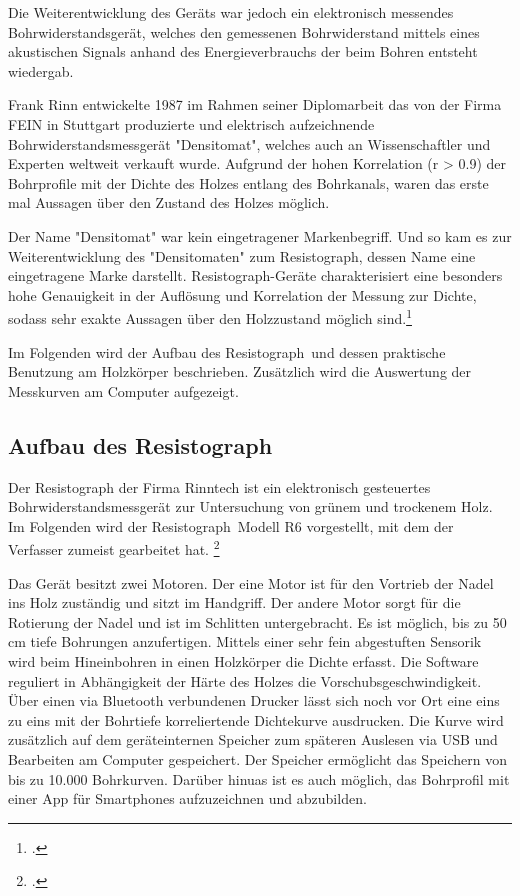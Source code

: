 \documentclass[a4paper, halfparskip]{article}
\def\SymbReg{\textsuperscript{\textregistered}}
\begin{document}
Die Weiterentwicklung des Geräts war jedoch ein elektronisch messendes
Bohrwiderstandsgerät, welches den gemessenen Bohrwiderstand mittels eines
akustischen Signals anhand des Energieverbrauchs der beim Bohren entsteht
wiedergab.

Frank Rinn entwickelte 1987 im Rahmen seiner Diplomarbeit das von der Firma
FEIN in Stuttgart produzierte und elektrisch aufzeichnende
Bohrwiderstandsmessgerät "Densitomat", welches auch an Wissenschaftler und
Experten weltweit verkauft wurde. Aufgrund der hohen Korrelation (r
\textgreater{} 0.9) der Bohrprofile mit der Dichte des Holzes entlang des
Bohrkanals, waren das erste mal Aussagen über den Zustand des Holzes möglich.

Der Name "Densitomat" war kein eingetragener Markenbegriff. Und so kam es zur
Weiterentwicklung des "Densitomaten" zum Resistograph\SymbReg, dessen Name
eine eingetragene Marke darstellt. Resistograph\SymbReg-Geräte charakterisiert
eine besonders hohe Genauigkeit in der Auflösung und Korrelation der Messung
zur Dichte, sodass sehr exakte Aussagen über den Holzzustand möglich
sind.\footcite{rinn:resi_drill_transition}

Im Folgenden wird der Aufbau des Resistograph\SymbReg\ und dessen praktische
Benutzung am Holzkörper beschrieben. Zusätzlich wird die Auswertung der
Messkurven am Computer aufgezeigt. 

\subsection{Aufbau des Resistograph\SymbReg}
Der Resistograph der Firma Rinntech ist ein elektronisch gesteuertes
Bohrwiderstandsmessgerät zur Untersuchung von grünem und trockenem Holz. Im
Folgenden wird der Resistograph\SymbReg\ Modell R6 vorgestellt, mit dem der
Verfasser zumeist gearbeitet hat.
\footcite{rinn:risserkennung}

Das Gerät besitzt zwei Motoren. Der eine Motor ist für den Vortrieb der Nadel
ins Holz zuständig und sitzt im Handgriff. Der andere Motor sorgt für die
Rotierung der Nadel und ist im Schlitten untergebracht. Es ist möglich, bis zu
50 cm tiefe Bohrungen anzufertigen. Mittels einer sehr fein abgestuften
Sensorik wird beim Hineinbohren in einen Holzkörper die Dichte erfasst. Die
Software reguliert in Abhängigkeit der Härte des Holzes die
Vorschubsgeschwindigkeit. Über einen via Bluetooth verbundenen Drucker lässt
sich noch vor Ort eine eins zu eins mit der Bohrtiefe korreliertende
Dichtekurve ausdrucken. Die Kurve wird zusätzlich auf dem geräteinternen
Speicher zum späteren Auslesen via USB und Bearbeiten am Computer gespeichert.
Der Speicher ermöglicht das Speichern von bis zu 10.000 Bohrkurven. Darüber
hinuas ist es auch möglich, das Bohrprofil mit einer App für Smartphones
aufzuzeichnen und abzubilden.
\end{document}
